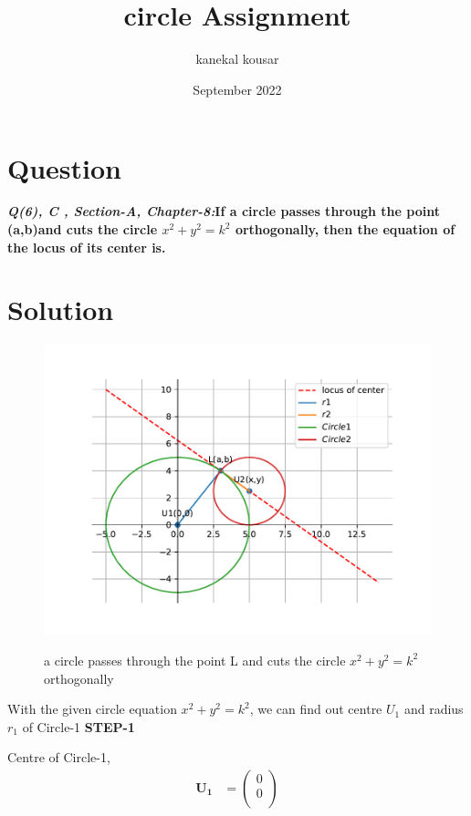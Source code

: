 \documentclass[journal,12pt,twocolumn]{IEEEtran}
\title{\textbf{\\circle Assignment}}
\author{kanekal kousar}
\date{September 2022}
\let\vec\mathbf
\begin{document}
\maketitle


\section{Question}
\textbf{\textit{Q(6), C , Section-A, Chapter-8:}If a circle passes through the point (a,b)and cuts the circle {$x^2+y^2=k^2$} orthogonally, then the equation of the locus of its center is.}

\section{Solution}
\raggedright 

\begin{figure}[h!]
\centering
\includegraphics[scale=0.5]{fig/cir.pdf} \\
\caption{a circle passes through the point L and cuts the circle {$x^2+y^2=k^2$} orthogonally}
\end{figure}

\vspace{0.25cm}
With the given circle equation {$x^2+y^2=k^2$}, we can find out centre \(U_1\) and radius \(r_1\) of Circle-1
\vspace{0.25cm}
\textbf{STEP-1}

Centre of Circle-1,
\boldmath 
\begin{align} 
\vec{U_1} &= \begin{pmatrix}0 \\ 0 \\ \end{pmatrix} 
\end{align}
\unboldmath
\end{document}
